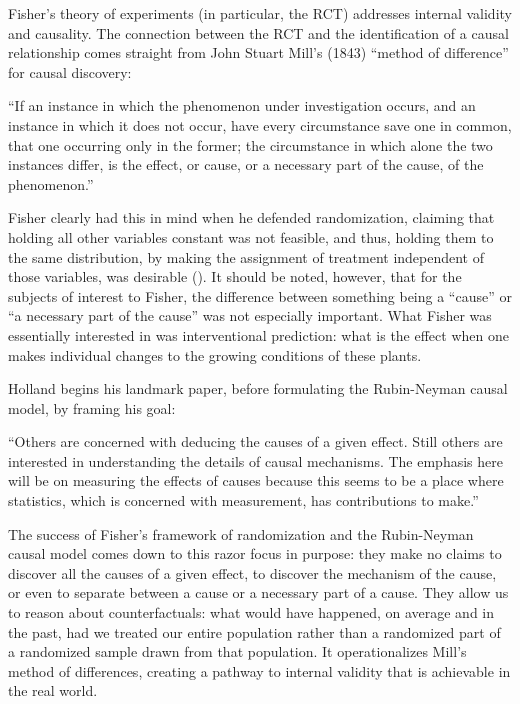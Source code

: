 \documentclass[a4paper,12pt]{article}
\begin{document}
Fisher's theory of experiments (in particular, the RCT) addresses internal validity and causality. The connection between the RCT and the identification of a causal relationship comes straight from John Stuart Mill's (1843) ``method of difference'' for causal discovery:

\begin{displayquote}
  ``If an instance in which the phenomenon under investigation occurs, and an instance in which it does not occur, have every circumstance save one in common, that one occurring only in the former; the circumstance in which alone the two instances differ, is the effect, or cause, or a necessary part of the cause, of the phenomenon.''
\end{displayquote}

Fisher \parencite*{Fisher1935} clearly had this in mind when he defended randomization, claiming that holding all other variables constant was not feasible, and thus, holding them to the same distribution, by making the assignment of treatment independent of those variables, was desirable (\cite{Rosenbaum2005}). It should be noted, however, that for the subjects of interest to Fisher, the difference between something being a ``cause'' or ``a necessary part of the cause'' was not especially important. What Fisher was essentially interested in was interventional prediction: what is the effect when one makes individual changes to the growing conditions of these plants.

Holland \parencite*{Holland1986} begins his landmark paper, before formulating the Rubin-Neyman causal model, by framing his goal:

\begin{displayquote}
``Others are concerned with deducing the causes of a given effect. Still others are interested in understanding the details of causal mechanisms. The emphasis here will be on measuring the effects of causes because this seems to be a place where statistics, which is concerned with measurement, has contributions to make.''
\end{displayquote}

The success of Fisher's framework of randomization and the Rubin-Neyman causal model comes down to this razor focus in purpose: they make no claims to discover all the causes of a given effect, to discover the mechanism of the cause, or even to separate between a cause or a necessary part of a cause. They allow us to reason about counterfactuals: what would have happened, on average and in the past, had we treated our entire population rather than a randomized part of a randomized sample drawn from that population. It operationalizes Mill's method of differences, creating a pathway to internal validity that is achievable in the real world.
\end{document}

